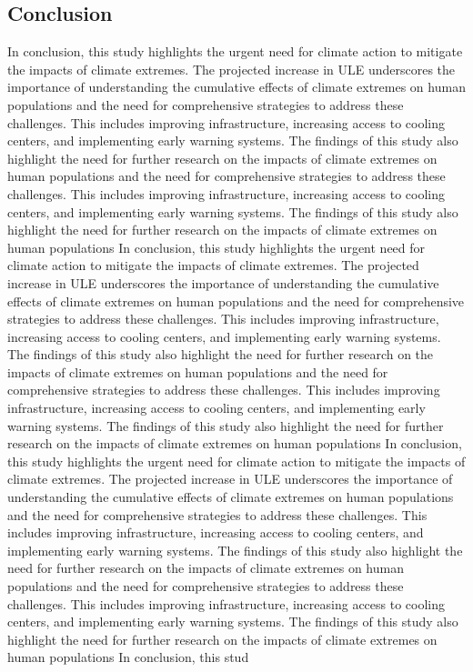 \documentclass[9pt, twoside]{extarticle}
\begin{document}
\begin{maintext}
\section*{Conclusion}
In conclusion, this study highlights the urgent need for climate action to mitigate the impacts of climate extremes. The projected increase in ULE underscores the importance of understanding the cumulative effects of climate extremes on human populations and the need for comprehensive strategies to address these challenges. This includes improving infrastructure, increasing access to cooling centers, and implementing early warning systems.\cite{IPCC2021} The findings of this study also highlight the need for further research on the impacts of climate extremes on human populations and the need for comprehensive strategies to address these challenges. This includes improving infrastructure, increasing access to cooling centers, and implementing early warning systems.\cite{IPCC2021} The findings of this study also highlight the need for further research on the impacts of climate extremes on human populations  In conclusion, this study highlights the urgent need for climate action to mitigate the impacts of climate extremes. The projected increase in ULE underscores the importance of understanding the cumulative effects of climate extremes on human populations and the need for comprehensive strategies to address these challenges. This includes improving infrastructure, increasing access to cooling centers, and implementing early warning systems.\cite{IPCC2021} The findings of this study also highlight the need for further research on the impacts of climate extremes on human populations and the need for comprehensive strategies to address these challenges. This includes improving infrastructure, increasing access to cooling centers, and implementing early warning systems.\cite{IPCC2021} The findings of this study also highlight the need for further research on the impacts of climate extremes on human populations  In conclusion, this study highlights the urgent need for climate action to mitigate the impacts of climate extremes. The projected increase in ULE underscores the importance of understanding the cumulative effects of climate extremes on human populations and the need for comprehensive strategies to address these challenges. This includes improving infrastructure, increasing access to cooling centers, and implementing early warning systems.\cite{IPCC2021} The findings of this study also highlight the need for further research on the impacts of climate extremes on human populations and the need for comprehensive strategies to address these challenges. This includes improving infrastructure, increasing access to cooling centers, and implementing early warning systems.\cite{IPCC2021} The findings of this study also highlight the need for further research on the impacts of climate extremes on human populations  In conclusion, this stud


\end{maintext}
\end{document}
